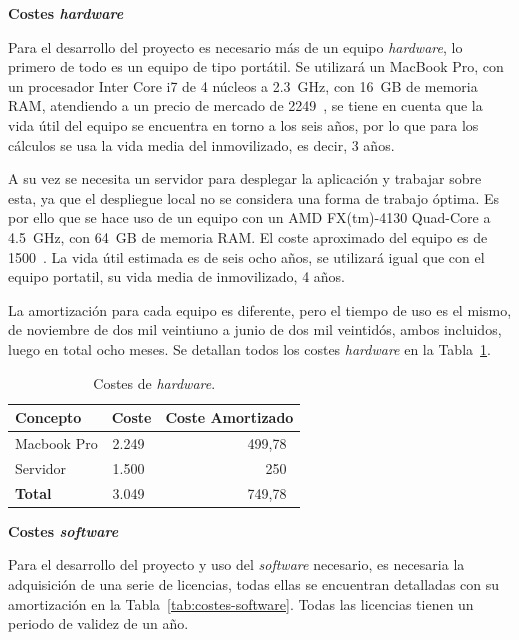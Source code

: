 \textbf{Costes \textit{hardware}}

Para el desarrollo del proyecto es necesario más de un equipo \textit{hardware}, lo primero de todo es un equipo de tipo portátil. Se utilizará un MacBook Pro, con un procesador Inter Core i7 de 4 núcleos a 2.3~GHz, con 16~GB de memoria RAM, atendiendo a un precio de mercado de 2249~\officialeuro, se tiene en cuenta que la vida útil del equipo se encuentra en torno a los seis años, por lo que para los cálculos se usa la vida media del inmovilizado, es decir, 3 años. 

A su vez se necesita un servidor para desplegar la aplicación y trabajar sobre esta, ya que el despliegue local no se considera una forma de trabajo óptima. Es por ello que se hace uso de un equipo con un AMD FX(tm)-4130 Quad-Core a 4.5~GHz, con 64~GB de memoria RAM. El coste aproximado del equipo es de 1500~\officialeuro. La vida útil estimada es de seis ocho años, se utilizará igual que con el equipo portatil, su vida media de inmovilizado, 4 años.

La amortización para cada equipo es diferente, pero el tiempo de uso es el mismo, de noviembre de dos mil veintiuno a junio de dos mil veintidós, ambos incluidos, luego en total ocho meses. Se detallan todos los costes \textit{hardware} en la Tabla~\ref{tab:costes-hardware}.

\begin{table}[H]
\centering
\begin{tabular}{lrr}
	\toprule
	\textbf{Concepto} & \textbf{Coste} & \textbf{Coste Amortizado}\\
	\midrule
	Macbook Pro & 2.249~\officialeuro & 499,78~\officialeuro \\
	Servidor & 1.500~\officialeuro & 250~\officialeuro \\
	\midrule
	\textbf{Total} & 3.049~\officialeuro & 749,78~\officialeuro \\
	\bottomrule
\end{tabular}
\caption{Costes de \emph{hardware}.}\label{tab:costes-hardware}
\end{table}

\textbf{Costes \textit{software}}

Para el desarrollo del proyecto y uso del \textit{software} necesario, es necesaria la adquisición de una serie de licencias, todas ellas se encuentran detalladas con su amortización en la Tabla~\ref{tab:costes-software}. Todas las licencias tienen un periodo de validez de un año.

